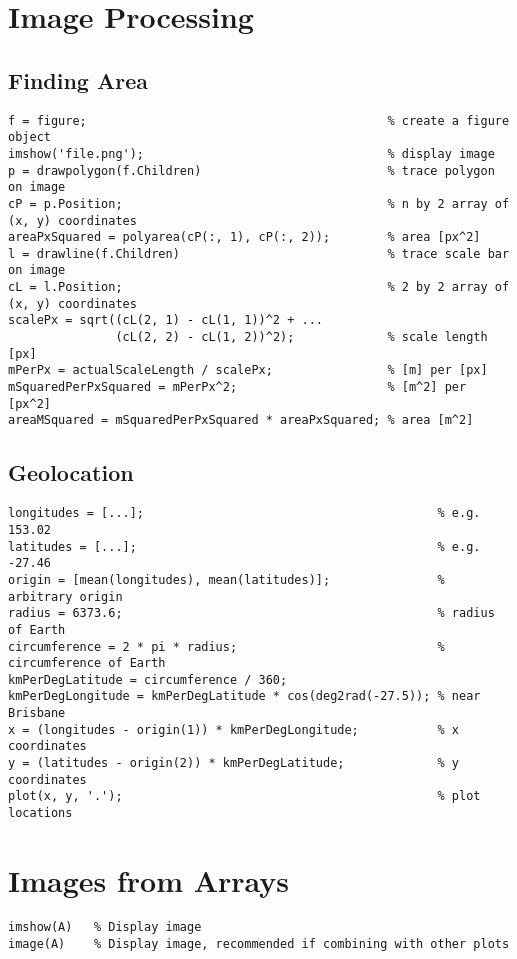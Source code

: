 \documentclass{article}
\begin{document}
\section*{Image Processing}
\subsection*{Finding Area}
\begin{lstlisting}
f = figure;                                          % create a figure object
imshow('file.png');                                  % display image 
p = drawpolygon(f.Children)                          % trace polygon on image
cP = p.Position;                                     % n by 2 array of (x, y) coordinates
areaPxSquared = polyarea(cP(:, 1), cP(:, 2));        % area [px^2]
l = drawline(f.Children)                             % trace scale bar on image
cL = l.Position;                                     % 2 by 2 array of (x, y) coordinates
scalePx = sqrt((cL(2, 1) - cL(1, 1))^2 + ...
               (cL(2, 2) - cL(1, 2))^2);             % scale length [px]
mPerPx = actualScaleLength / scalePx;                % [m] per [px]
mSquaredPerPxSquared = mPerPx^2;                     % [m^2] per [px^2]
areaMSquared = mSquaredPerPxSquared * areaPxSquared; % area [m^2]
\end{lstlisting}
\subsection*{Geolocation}
\begin{lstlisting}
longitudes = [...];                                         % e.g. 153.02
latitudes = [...];                                          % e.g. -27.46
origin = [mean(longitudes), mean(latitudes)];               % arbitrary origin
radius = 6373.6;                                            % radius of Earth
circumference = 2 * pi * radius;                            % circumference of Earth
kmPerDegLatitude = circumference / 360;                     
kmPerDegLongitude = kmPerDegLatitude * cos(deg2rad(-27.5)); % near Brisbane
x = (longitudes - origin(1)) * kmPerDegLongitude;           % x coordinates
y = (latitudes - origin(2)) * kmPerDegLatitude;             % y coordinates
plot(x, y, '.');                                            % plot locations
\end{lstlisting}
\section*{Images from Arrays}
\begin{lstlisting}
imshow(A)   % Display image
image(A)    % Display image, recommended if combining with other plots
\end{lstlisting}
\end{document}
